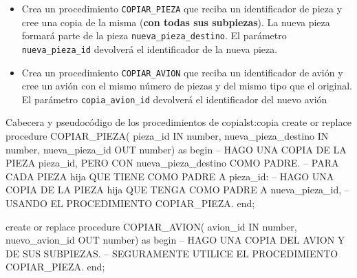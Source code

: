 \needspace{.15\textheight}
\begin{homeworkProblem}
  \begin{itemize}
  \item Crea un procedimiento \texttt{COPIAR\_PIEZA}
    que reciba un identificador de pieza y cree una copia de la misma (\textbf{con todas sus subpiezas}). La nueva pieza
    formará parte de la pieza \texttt{nueva\_pieza\_destino}. El parámetro \texttt{nueva\_pieza\_id} devolverá el
    identificador de la nueva pieza.

   
  \item Crea un procedimiento \texttt{COPIAR\_AVION} que reciba un identificador de avión y cree un avión con el mismo número de piezas y del mismo tipo que
    el original. El parámetro \texttt{copia\_avion\_id} devolverá el identificador del nuevo avión
  \end{itemize}

\begin{listadosql}{Cabecera y pseudocódigo de los procedimientos de copia}{lst:copia}
create or replace procedure COPIAR_PIEZA(
  pieza_id IN number, 
  nueva_pieza_destino IN number, 
  nueva_pieza_id OUT number) 
as
begin
  -- HAGO UNA COPIA DE LA PIEZA pieza_id, PERO CON nueva_pieza_destino COMO PADRE.
  -- PARA CADA PIEZA hija QUE TIENE COMO PADRE A pieza_id:
  --   HAGO UNA COPIA DE LA PIEZA hija QUE TENGA COMO PADRE A nueva_pieza_id,
  --   USANDO EL PROCEDIMIENTO COPIAR_PIEZA.
end; 

create or replace procedure COPIAR_AVION(
  avion_id IN number, 
  nuevo_avion_id OUT number) 
as
begin
  -- HAGO UNA COPIA DEL AVION Y DE SUS SUBPIEZAS.
  -- SEGURAMENTE UTILICE EL PROCEDIMIENTO COPIAR_PIEZA.
end;
\end{listadosql}

\end{homeworkProblem}

